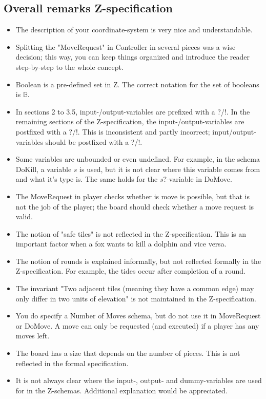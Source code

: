 \documentclass[a4paper,11pt]{article}
\begin{document}
    \subsection{Overall remarks Z-specification}
    \begin{itemize}
        \item The description of your coordinate-system is very nice and understandable.
        \item Splitting the "MoveRequest" in Controller in several pieces was a wise decision; this way, you can keep things organized and introduce the reader step-by-step to the whole concept.
        \item Boolean is a pre-defined set in Z. The correct notation for the set of booleans is $\mathds{B}$.
        \item In sections 2 to  3.5, input-/output-variables are prefixed with a ?/!. In the remaining sections of the Z-specification, the input-/output-variables are postfixed with a ?/!. This is inconsistent and partly incorrect; input/output-variables should be postfixed with a ?/!.
        \item Some variables are unbounded or even undefined. For example, in the schema DoKill, a variable $s$ is used, but it is not clear where this variable comes from and what it's type is. The same holds for the $s?$-variable in DoMove.
        \item The MoveRequest in player checks whether is move is possible, but that is not the job of the player; the board should check whether a move request is valid.
        \item The notion of "safe tiles" is not reflected in the Z-specification. This is an important factor when a fox wants to kill a dolphin and vice versa.
        \item The notion of rounds is explained informally, but not reflected formally in the Z-specification. For example, the tides occur after completion of a round.
        \item The invariant "Two adjacent tiles (meaning they have a common edge) may only differ in two units of elevation" is not maintained in the Z-specification.
        \item You do specify a Number of Moves schema, but do not use it in MoveRequest or DoMove. A move can only be requested (and executed) if a player has any moves left.
        \item The board has a size that depends on the number of pieces. This is not reflected in the formal specification.
        \item It is not always clear where the input-, output- and dummy-variables are used for in the Z-schemas. Additional explanation would be appreciated.
    \end{itemize}
\end{document}
